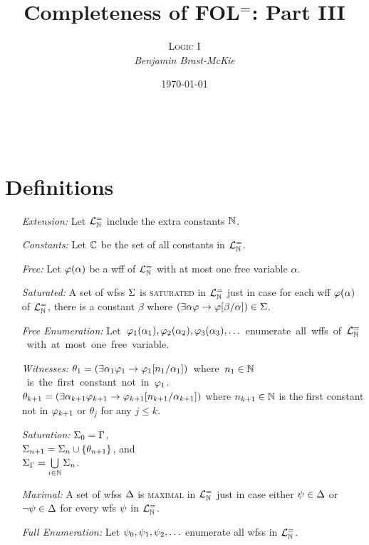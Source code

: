 \documentclass[a4paper, 11pt]{article} %
\title{\textbf{Completeness of FOL$^=$: Part III}} %
\author{\textsc{Logic I}\\ \em Benjamin Brast-McKie} %
\date{\today} %
\makeatletter
\renewcommand{\maketitle}{
\begin{flushright}
{\LARGE\@title}

\vspace{10pt}

{\@author}
\\ \@date
\end{flushright}

\vspace{-50pt}

}
\makeatother
\begin{document}
\maketitle %

\thispagestyle{empty}


\section*{Definitions}

\begin{itemize}
  \item[\it Extension:] Let $\mathcal{L}^{=}_{\mathbb{N}}$ include the extra constants $\mathbb{N}$.
  \item[\it Constants:] Let $\mathbb{C}$ be the set of all constants in $\mathcal{L}^{=}_{\mathbb{N}}$.
  \item[\it Free:] Let $\varphi(\alpha)$ be a wff of $\mathcal{L}^{=}_{\mathbb{N}}$ with at most one free variable $\alpha$.
  \item[\it Saturated:] A set of wfss $\Sigma$ is \textsc{saturated} in $\mathcal{L}^{=}_{\mathbb{N}}$ just in case for each wff $\varphi(\alpha)$ of $\mathcal{L}^{=}_{\mathbb{N}}$, there is a constant $\beta$ where $(\exists \alpha\varphi \rightarrow \varphi[\beta/\alpha])\in\Sigma$.
  \item[\it Free Enumeration:] \mbox{Let $\varphi_1(\alpha_1),\varphi_2(\alpha_2),\varphi_3(\alpha_3),\ldots$ enumerate all wffs of $\mathcal{L}^{=}_{\mathbb{N}}$ with at most one free variable.}
  \item[\it Witnesses:] \mbox{$\theta_1=(\exists \alpha_1\varphi_1\rightarrow \varphi_1[n_1/\alpha_1])$ where $n_1\in\mathbb{N}$ is the first constant not in $\varphi_1$.}\vspace{.05in}\\
    $\theta_{k+1}=(\exists \alpha_{k+1}\varphi_{k+1}\rightarrow \varphi_{k+1}[n_{k+1}/\alpha_{k+1}])$  where $n_{k+1}\in\mathbb{N}$ is the first constant not in $\varphi_{k+1}$ or $\theta_j$ for any $j\leq k$.
  \item[\it Saturation:]
    $\Sigma_0 = \Gamma$,\\
    $\Sigma_{n+1} = \Sigma_n\cup\lbrace\theta_{n+1}\rbrace$, and\\
    $\Sigma_{\Gamma} = \bigcup\limits_{i\in\mathbb{N}}\Sigma_n$.
  \item[\it Maximal:] A set of wfss $\Delta$ is \textsc{maximal} in $\mathcal{L}^{=}_{\mathbb{N}}$ just in case either $\psi\in\Delta$ or $\neg\psi\in\Delta$ for every wfs $\psi$ in $\mathcal{L}^{=}_{\mathbb{N}}$.
  \item[\it Full Enumeration:] Let $\psi_0,\psi_1,\psi_2,\ldots$ enumerate all wfss in $\mathcal{L}^{=}_{\mathbb{N}}$.

\end{itemize}
\end{document}
